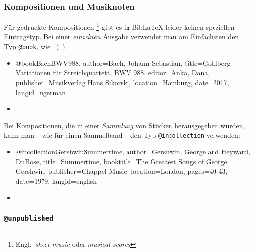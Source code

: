 
\subsubsection{Kompositionen und Musiknoten}
\label{sec:Musiknoten}

Für gedruckte Kompositionen%
\footnote{Engl.\ \emph{sheet music} oder \emph{musical scores}}
gibt es in BibLaTeX leider keinen speziellen Eintragstyp. Bei einer
\emph{einzelnen} Ausgabe verwendet man am Einfachsten den Typ \texttt{@book},
wie \zB\ (\sa\ \cite{HaydnCelloConcerto2,ShostakovichOp110})
%
\begin{itemize}
\item[]
\begin{GenericCode}[numbers=none]
@book{BachBWV988,
  author={Bach, Johann Sebastian},
  title={Goldberg-Variationen für Streichquartett, BWV 988},
  editor={Anka, Dana},
  publisher={Musikverlag Hans Sikorski},
  location={Hamburg},
  date={2017},
  langid={ngerman}
}
\end{GenericCode}
\item[\cite{BachBWV988}] 
\end{itemize}
%
Bei Kompositionen, die in einer \emph{Sammlung} von Stücken herausgegeben
wurden, kann man -- wie für einen Sammelband -- den Typ
\texttt{@incollection} verwenden:
%
\begin{itemize}
\item[]
\begin{GenericCode}[numbers=none]
@incollection{GershwinSummertime,
  author={Gershwin, George and Heyward, DuBose},
  title={Summertime},
  booktitle={The Greatest Songs of George Gershwin},
  publisher={Chappel Music},
  location={London},
  pages={40-43},
  date={1979},
  langid={english}
}
\end{GenericCode}
\item[\cite{GershwinSummertime}] 
\end{itemize}

\subsubsection{\texttt{\bfseries @unpublished}}
\label{sec:@unpublished}

